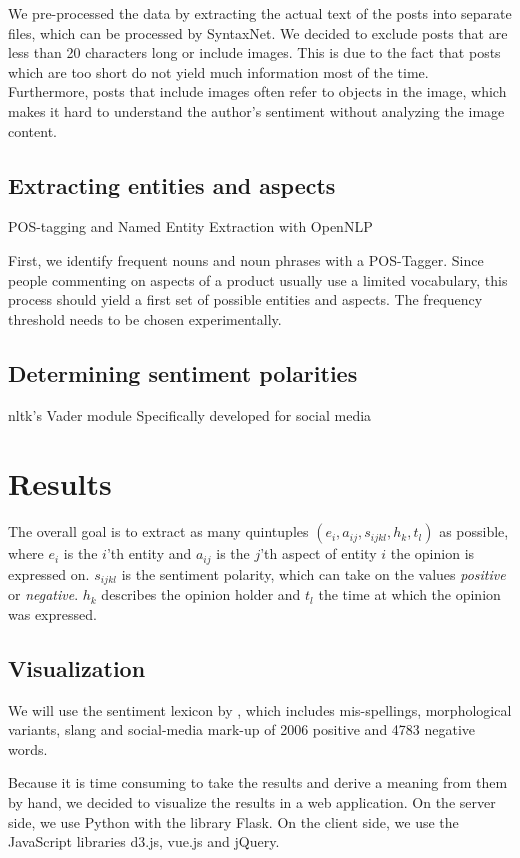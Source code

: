 \documentclass[10pt,a4paper]{article}
\begin{document}
		We pre-processed the data by extracting the actual text of the posts into separate files, which can be processed by SyntaxNet. We decided to exclude posts that are less than 20 characters long or include images. This is due to the fact that posts which are too short do not yield much information most of the time. Furthermore, posts that include images often refer to objects in the image, which makes it hard to understand the author's sentiment without analyzing the image content.
	
		\subsection{Extracting entities and aspects}
		POS-tagging and Named Entity Extraction with OpenNLP

		First, we identify frequent nouns and noun phrases with a POS-Tagger. Since people commenting on aspects of a product usually use a limited vocabulary, this process should yield a first set of possible entities and aspects. The frequency threshold needs to be chosen experimentally.

		\subsection{Determining sentiment polarities}
		nltk's Vader module
		Specifically developed for social media

	\section{Results}
		The overall goal is to extract as many quintuples $(e_i, a_{ij}, s_{ijkl}, h_k, t_l)$ as possible, where $e_i$ is the $i$'th entity and $a_{ij}$ is the $j$'th aspect of entity $i$ the opinion is expressed on. $s_{ijkl}$ is the sentiment polarity, which can take on the values \textit{positive} or \textit{negative}. $h_k$ describes the opinion holder and $t_l$ the time at which the opinion was expressed.

		\subsection{Visualization}
		We will use the sentiment lexicon by \cite{Hu:2004:MSC:1014052.1014073}, which includes mis-spellings, morphological variants, slang and social-media mark-up of 2006 positive and 4783 negative words.

		Because it is time consuming to take the results and derive a meaning from them by hand, we decided to visualize the results in a web application. On the server side, we use Python with the library Flask. On the client side, we use the JavaScript libraries d3.js, vue.js and jQuery.
	
\end{document}
